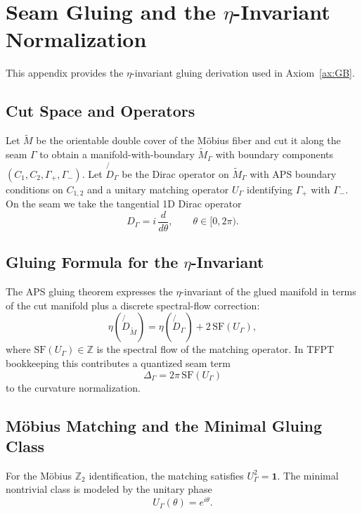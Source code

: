 \section{\texorpdfstring{Seam Gluing and the $\eta$-Invariant Normalization}{Seam Gluing and the eta-Invariant Normalization}}
\label{app:seam}

This appendix provides the $\eta$-invariant gluing derivation used in Axiom~\ref{ax:GB}.

\subsection{Cut Space and Operators}
Let $\widetilde{M}$ be the orientable double cover of the M\"obius fiber and cut it along
the seam $\Gamma$ to obtain a manifold-with-boundary $\widetilde{M}_\Gamma$ with
boundary components $(C_1,C_2,\Gamma_+,\Gamma_-)$. Let $\not{D}_\Gamma$ be the Dirac operator
on $\widetilde{M}_\Gamma$ with APS boundary conditions on $C_{1,2}$ and a unitary matching
operator $U_\Gamma$ identifying $\Gamma_+$ with $\Gamma_-$.
On the seam we take the tangential 1D Dirac operator
\begin{equation}
    D_\Gamma = i\,\frac{d}{d\theta}, \qquad \theta\in[0,2\pi).
\end{equation}

\subsection{\texorpdfstring{Gluing Formula for the $\eta$-Invariant}{Gluing Formula for the eta-Invariant}}
The APS gluing theorem expresses the $\eta$-invariant of the glued manifold in terms of
the cut manifold plus a discrete spectral-flow correction:
\begin{equation}
    \eta(\not{D}_{\widetilde{M}}) = \eta(\not{D}_\Gamma) + 2\,\mathrm{SF}(U_\Gamma),
\end{equation}
where $\mathrm{SF}(U_\Gamma)\in\mathbb{Z}$ is the spectral flow of the matching operator.
In TFPT bookkeeping this contributes a quantized seam term
\begin{equation}
    \Delta_\Gamma = 2\pi\,\mathrm{SF}(U_\Gamma)
\end{equation}
to the curvature normalization.

\subsection{M\"obius Matching and the Minimal Gluing Class}
For the M\"obius $\mathbb{Z}_2$ identification, the matching satisfies $U_\Gamma^2=\mathbf{1}$.
The minimal nontrivial class is modeled by the unitary phase
\begin{equation}
    U_\Gamma(\theta)=e^{i\theta}.
\end{equation}

